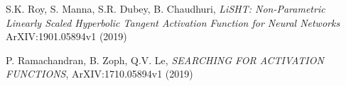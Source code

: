 \documentclass{amsart}
\theoremstyle{definition}
\theoremstyle{remark}
\numberwithin{equation}{section}
\begin{document}

\begin{thebibliography}{10}

 S.K. Roy, S. Manna, S.R. Dubey, B. Chaudhuri, \textit{LiSHT: Non-Parametric Linearly Scaled Hyperbolic Tangent Activation Function for Neural Networks} ArXIV:1901.05894v1 (2019)

 P. Ramachandran, B. Zoph, Q.V. Le, \textit{SEARCHING FOR ACTIVATION FUNCTIONS}, ArXIV:1710.05894v1 (2019)

\end{thebibliography}
\end{document}

